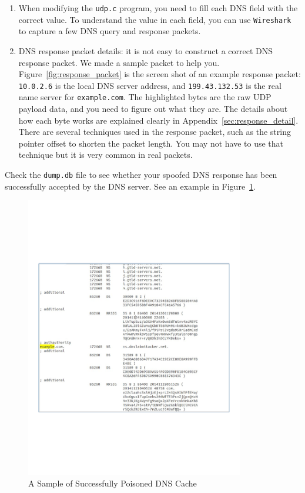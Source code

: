 \begin{enumerate}

\item When modifying the {\tt udp.c} program, you need to fill 
each DNS field with the correct value.  To understand the value in each
field, you can use {\tt Wireshark} to capture a few DNS query and response packets. 

\item DNS response packet details: it is not easy to construct a correct DNS
response packet. We made a sample packet to help you.
Figure~\ref{fig:response_packet} is the screen shot of an example response packet:
{\tt 10.0.2.6} is the local DNS server address, and 
{\tt 199.43.132.53} is the real name server for {\tt example.com}. 
The highlighted bytes are the raw UDP payload data, and you need to figure
out what they are.
The details about how each byte works are explained clearly in 
Appendix~\ref{sec:response_detail}.
There are several techniques used in the response packet, such as  
the string pointer offset to shorten the packet length. 
You may not have to use that technique but it is
very common in real packets.

\end{enumerate} 


Check the {\tt dump.db} file to see whether your spoofed DNS
response has been successfully accepted by the DNS server. 
See an example in Figure~\ref{fig:cache_screenshot}.

\begin{figure}[H]
\centering
\includegraphics*[viewport=0 180 600 630,width=0.85\textwidth]{Figs/cache_screenshot.pdf}
\caption{A Sample of Successfully Poisoned DNS Cache}
\label{fig:cache_screenshot}
\end{figure}


